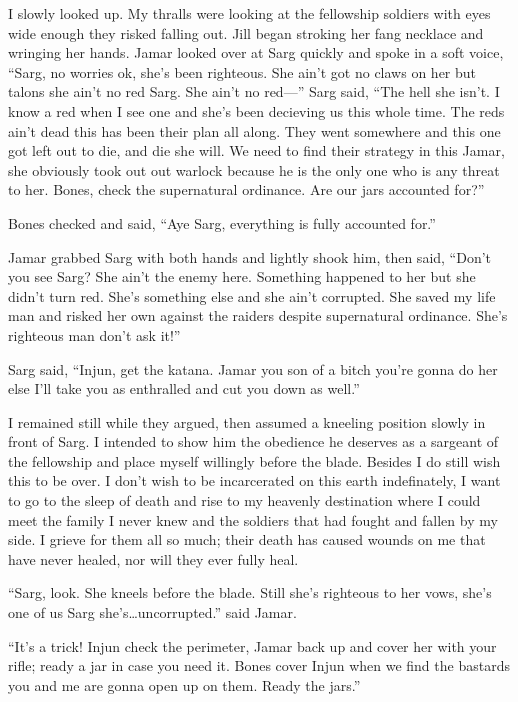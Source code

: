 I slowly looked up. My thralls were looking at the fellowship soldiers with eyes wide enough they risked falling out. Jill began stroking her fang necklace and wringing her hands. Jamar looked over at Sarg quickly and spoke in a soft voice, ``Sarg, no worries ok, she's been righteous. She ain't got no claws on her but talons she ain't no red Sarg. She ain't no red---'' Sarg said, ``The hell she isn't. I know a red when I see one and she's been decieving us this whole time. The reds ain't dead this has been their plan all along. They went somewhere and this one got left out to die, and die she will. We need to find their strategy in this Jamar, she obviously took out out warlock because he is the only one who is any threat to her. Bones, check the supernatural ordinance. Are our jars accounted for?'' 

Bones checked and said, ``Aye Sarg, everything is fully accounted for.'' 

Jamar grabbed Sarg with both hands and lightly shook him, then said, ``Don't you see Sarg? She ain't the enemy here. Something happened to her but she didn't turn red. She's something else and she ain't corrupted. She saved my life man and risked her own against the raiders despite supernatural ordinance. She's righteous man don't ask it!''

Sarg said, ``Injun, get the katana. Jamar you son of a bitch you're gonna do her else I'll take you as enthralled and cut you down as well.'' 

I remained still while they argued, then assumed a kneeling position slowly in front of Sarg. I intended to show him the obedience he deserves as a sargeant of the fellowship and place myself willingly before the blade. Besides I do still wish this to be over. I don't wish to be incarcerated on this earth indefinately, I want to go to the sleep of death and rise to my heavenly destination where I could meet the family I never knew and the soldiers that had fought and fallen by my side. I grieve for them all so much; their death has caused wounds on me that have never healed, nor will they ever fully heal.

``Sarg, look. She kneels before the blade. Still she's righteous to her vows, she's one of us Sarg she's\dots uncorrupted.'' said Jamar. 

``It's a trick! Injun check the perimeter, Jamar back up and cover her with your rifle; ready a jar in case you need it. Bones cover Injun when we find the bastards you and me are gonna open up on them. Ready the jars.'' 

